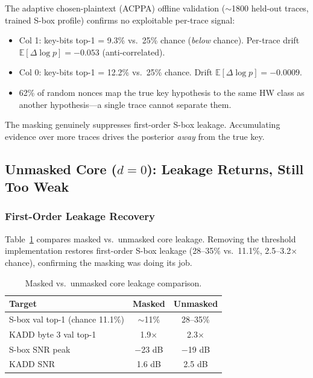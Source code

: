 \documentclass[a4paper,11pt,twocolumn]{article}
\begin{document}
The adaptive chosen-plaintext (ACPPA) offline validation ($\sim$1800 held-out traces, trained S-box profile) confirms no exploitable per-trace signal:

\begin{itemize}[leftmargin=*,nosep]
\item Col 1: key-bits top-1 = 9.3\% vs.\ 25\% chance (\emph{below} chance). Per-trace drift $\mathbb{E}[\Delta\log p] = -0.053$ (anti-correlated).
\item Col 0: key-bits top-1 = 12.2\% vs.\ 25\% chance. Drift $\mathbb{E}[\Delta\log p] = -0.0009$.
\item 62\% of random nonces map the true key hypothesis to the same HW class as another hypothesis---a single trace cannot separate them.
\end{itemize}

The masking genuinely suppresses first-order S-box leakage. Accumulating evidence over more traces drives the posterior \emph{away} from the true key.

\subsection{Unmasked Core ($d=0$): Leakage Returns, Still Too Weak}

\subsubsection{First-Order Leakage Recovery}

Table~\ref{tab:unmasked_compare} compares masked vs.\ unmasked core leakage. Removing the threshold implementation restores first-order S-box leakage (28--35\% vs.\ 11.1\%, 2.5--3.2$\times$ chance), confirming the masking was doing its job.

\begin{table}[t]
\centering
\caption{Masked vs.\ unmasked core leakage comparison.}
\label{tab:unmasked_compare}
\begin{tabular}{lcc}
\toprule
Target & Masked & Unmasked \\
\midrule
S-box val top-1 (chance 11.1\%) & $\sim$11\% & 28--35\% \\
KADD byte 3 val top-1 & 1.9$\times$ & 2.3$\times$ \\
S-box SNR peak & $-$23 dB & $-$19 dB \\
KADD SNR & 1.6 dB & 2.5 dB \\
\bottomrule
\end{tabular}
\end{table}
\end{document}
